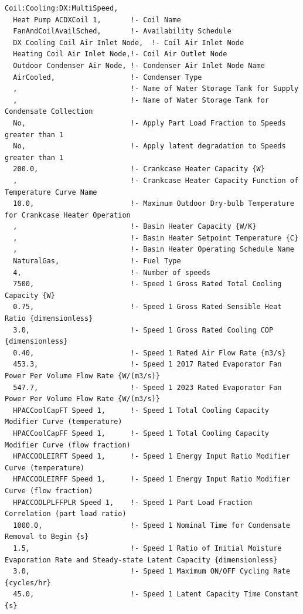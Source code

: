 \begin{lstlisting}
Coil:Cooling:DX:MultiSpeed,
  Heat Pump ACDXCoil 1,       !- Coil Name
  FanAndCoilAvailSched,       !- Availability Schedule
  DX Cooling Coil Air Inlet Node,  !- Coil Air Inlet Node
  Heating Coil Air Inlet Node,!- Coil Air Outlet Node
  Outdoor Condenser Air Node, !- Condenser Air Inlet Node Name
  AirCooled,                  !- Condenser Type
  ,                           !- Name of Water Storage Tank for Supply
  ,                           !- Name of Water Storage Tank for Condensate Collection
  No,                         !- Apply Part Load Fraction to Speeds greater than 1
  No,                         !- Apply latent degradation to Speeds greater than 1
  200.0,                      !- Crankcase Heater Capacity {W}
  ,                           !- Crankcase Heater Capacity Function of Temperature Curve Name
  10.0,                       !- Maximum Outdoor Dry-bulb Temperature for Crankcase Heater Operation
  ,                           !- Basin Heater Capacity {W/K}
  ,                           !- Basin Heater Setpoint Temperature {C}
  ,                           !- Basin Heater Operating Schedule Name
  NaturalGas,                 !- Fuel Type
  4,                          !- Number of speeds
  7500,                       !- Speed 1 Gross Rated Total Cooling Capacity {W}
  0.75,                       !- Speed 1 Gross Rated Sensible Heat Ratio {dimensionless}
  3.0,                        !- Speed 1 Gross Rated Cooling COP {dimensionless}
  0.40,                       !- Speed 1 Rated Air Flow Rate {m3/s}
  453.3,                      !- Speed 1 2017 Rated Evaporator Fan Power Per Volume Flow Rate {W/(m3/s)}
  547.7,                      !- Speed 1 2023 Rated Evaporator Fan Power Per Volume Flow Rate {W/(m3/s)}
  HPACCoolCapFT Speed 1,      !- Speed 1 Total Cooling Capacity Modifier Curve (temperature)
  HPACCoolCapFF Speed 1,      !- Speed 1 Total Cooling Capacity Modifier Curve (flow fraction)
  HPACCOOLEIRFT Speed 1,      !- Speed 1 Energy Input Ratio Modifier Curve (temperature)
  HPACCOOLEIRFF Speed 1,      !- Speed 1 Energy Input Ratio Modifier Curve (flow fraction)
  HPACCOOLPLFFPLR Speed 1,    !- Speed 1 Part Load Fraction Correlation (part load ratio)
  1000.0,                     !- Speed 1 Nominal Time for Condensate Removal to Begin {s}
  1.5,                        !- Speed 1 Ratio of Initial Moisture Evaporation Rate and Steady-state Latent Capacity {dimensionless}
  3.0,                        !- Speed 1 Maximum ON/OFF Cycling Rate {cycles/hr}
  45.0,                       !- Speed 1 Latent Capacity Time Constant {s}

\end{lstlisting}
